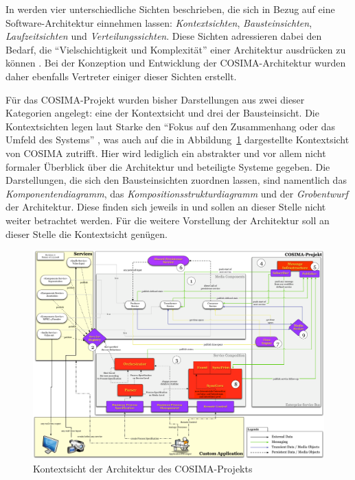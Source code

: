   In \citep[S. 83]{effektive_software_architekturen} werden vier unterschiedliche Sichten beschrieben, die sich in Bezug auf eine Software-Architektur einnehmen lassen: \emph{Kontextsichten}, \emph{Bausteinsichten}, \emph{Laufzeitsichten} und \emph{Verteilungssichten}. Diese Sichten adressieren dabei den Bedarf, die "`Vielschichtigkeit und Komplexität"' einer Architektur ausdrücken zu können \citep[S. 81]{effektive_software_architekturen}. Bei der Konzeption und Entwicklung der COSIMA-Architektur wurden daher ebenfalls Vertreter einiger dieser Sichten erstellt.
  
  Für das COSIMA-Projekt wurden bisher Darstellungen aus zwei dieser Kategorien angelegt: eine der Kontextsicht und drei der Bausteinsicht. Die Kontextsichten legen laut Starke den "`Fokus auf den Zusammenhang oder das Umfeld des Systems"' \citep[S. 87]{effektive_software_architekturen}, was auch auf die in Abbildung~\ref{fig:Kontextsicht_Architektur_COSIMA} dargestellte Kontextsicht von COSIMA zutrifft. Hier wird lediglich ein abstrakter und vor allem nicht formaler Überblick über die Architektur und beteiligte Systeme gegeben. Die Darstellungen, die sich den Bausteinsichten zuordnen lassen, sind namentlich das \emph{Komponentendiagramm}, das \emph{Kompositionsstrukturdiagramm} und der \emph{Grobentwurf} der Architektur. Diese finden sich jeweils in \citep{bericht} und sollen an dieser Stelle nicht weiter betrachtet werden. Für die weitere Vorstellung der Architektur soll an dieser Stelle die Kontextsicht genügen.

  \begin{figure}
    \centering
    \includegraphics[width=\textwidth]{images/Kontextsicht_Architektur_COSIMA}
    \caption{Kontextsicht der Architektur des COSIMA-Projekts}
    \label{fig:Kontextsicht_Architektur_COSIMA}
  \end{figure}

